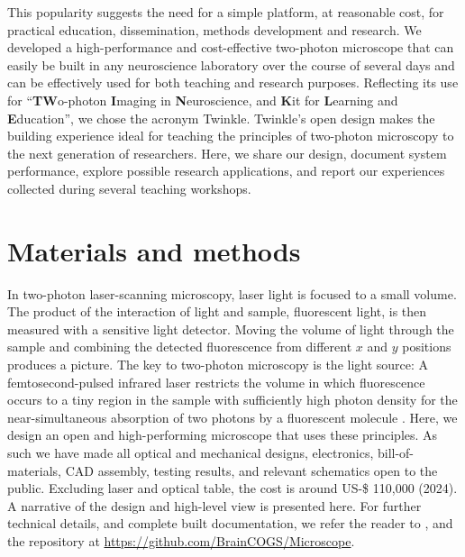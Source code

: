 \documentclass[10pt,letterpaper]{article}
\begin{document}
This popularity suggests the need for a simple platform, at reasonable cost, for practical education, dissemination, methods development and research. We developed a high-performance and cost-effective two-photon microscope that can easily be built in any neuroscience laboratory over the course of several days and can be effectively used for both teaching and research purposes. Reflecting its use for ``\textbf{TW}o-photon \textbf{I}maging in \textbf{N}euroscience, and \textbf{K}it for \textbf{L}earning and \textbf{E}ducation'', we chose the acronym Twinkle. Twinkle's open design makes the building experience ideal for teaching the principles of two-photon microscopy to the next generation of researchers. Here, we share our design, document system performance, explore possible research applications, and report our experiences collected during several teaching workshops.

\section*{Materials and methods}
In two-photon laser-scanning microscopy\cite{Denk1990}, laser light is focused to a small volume. The product of the interaction of light and sample, fluorescent light, is then measured with a sensitive light detector. Moving the volume of light through the sample and combining the detected fluorescence from different $x$ and $y$ positions produces a picture. The key to two-photon microscopy is the light source: A femtosecond-pulsed infrared laser restricts the volume in which fluorescence occurs to a tiny region in the sample with sufficiently high photon density for the near-simultaneous absorption of two photons by a fluorescent molecule \cite{Denk1990, Svoboda1997, So2000, Helmchen2005}.\newline
Here, we design an open and high-performing microscope that uses these principles. As such we have made all optical and mechanical designs, electronics, bill-of-materials, CAD assembly, testing results, and relevant schematics open to the public. Excluding laser and optical table, the cost is around US-\$ 110,000 (2024). A narrative of the design and high-level view is presented here. For further technical details, and complete built documentation, we refer the reader to , and the repository at \url{https://github.com/BrainCOGS/Microscope}.
\end{document}
